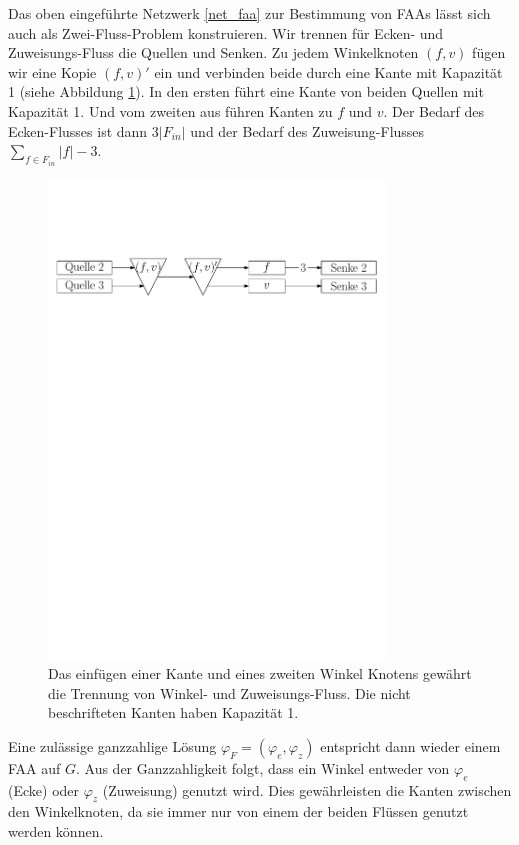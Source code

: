 \begin{remark}

Das oben eingeführte Netzwerk \ref{net_faa} zur Bestimmung von FAAs lässt sich auch als Zwei-Fluss-Problem konstruieren. Wir trennen für Ecken- und Zuweisungs-Fluss die Quellen und Senken.  Zu jedem Winkelknoten $(f,v)$ fügen wir eine Kopie $(f,v)'$ ein und verbinden beide durch eine Kante mit Kapazität 1 (siehe Abbildung \ref{faa_as_2}). In den ersten führt eine Kante von beiden Quellen mit Kapazität 1. Und vom zweiten aus führen Kanten zu $f$ und $v$. Der Bedarf des Ecken-Flusses ist dann $3|F_{in}|$ und der Bedarf des Zuweisung-Flusses $\sum_{f \in F_{in}}{|f|-3}$.

\begin{figure}[h]
	\centering
  \includegraphics[width=0.8\textwidth]{faa_2_flow.pdf}
  \caption{Das einfügen einer Kante und eines zweiten Winkel Knotens gewährt die Trennung von Winkel- und Zuweisungs-Fluss. Die nicht beschrifteten Kanten haben Kapazität 1.}
  \label{faa_as_2}
\end{figure}

Eine zulässige ganzzahlige Lösung $\varphi_F = (\varphi_e,\varphi_z)$ entspricht dann wieder einem FAA auf $G$. Aus der Ganzzahligkeit folgt, dass ein Winkel entweder von $\varphi_{e}$ (Ecke) oder $\varphi_{z}$ (Zuweisung) genutzt wird. Dies gewährleisten die Kanten zwischen den Winkelknoten, da sie immer nur von einem der beiden Flüssen genutzt werden können.
\end{remark}

